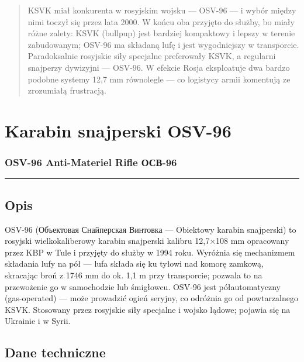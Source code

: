 \documentclass[12pt,openany,oneside]{book}
\begin{document}
\begin{quote}
KSVK miał konkurenta w rosyjskim wojsku --- OSV-96 --- i wybór między
nimi toczył się przez lata 2000. W końcu oba przyjęto do służby, bo
miały różne zalety: KSVK (bullpup) jest bardziej kompaktowy i lepszy w
terenie zabudowanym; OSV-96 ma składaną lufę i jest wygodniejszy w
transporcie. Paradoksalnie rosyjskie siły specjalne preferowały KSVK, a
regularni snajperzy dywizyjni --- OSV-96. W efekcie Rosja eksploatuje
dwa bardzo podobne systemy 12,7 mm równolegle --- co logistycy armii
komentują ze zrozumiałą frustracją.
\end{quote}

\chapter{Karabin snajperski OSV-96}\label{karabin-snajperski-osv-96}

\subsection{OSV-96 Anti-Materiel Rifle \textbar{}
ОСВ-96}\label{osv-96-anti-materiel-rifle-ux43eux441ux432-96}

\begin{center}\rule{0.5\linewidth}{0.5pt}\end{center}

\section{Opis}\label{opis-66}

OSV-96 (Объектовая Снайперская Винтовка --- Obiektowy karabin
snajperski) to rosyjski wielkokaliberowy karabin snajperski kalibru
12,7×108 mm opracowany przez KBP w Tule i przyjęty do służby w 1994
roku. Wyróżnia się mechanizmem składania lufy na pół --- lufa składa się
ku tyłowi nad komorę zamkową, skracając broń z 1746 mm do ok. 1,1 m przy
transporcie; pozwala to na przewożenie go w samochodzie lub śmigłowcu.
OSV-96 jest półautomatyczny (gas-operated) --- może prowadzić ogień
seryjny, co odróżnia go od powtarzalnego KSVK. Stosowany przez rosyjskie
siły specjalne i wojsko lądowe; pojawia się na Ukrainie i w Syrii.

\section{Dane techniczne}\label{dane-techniczne-66}
\end{document}
